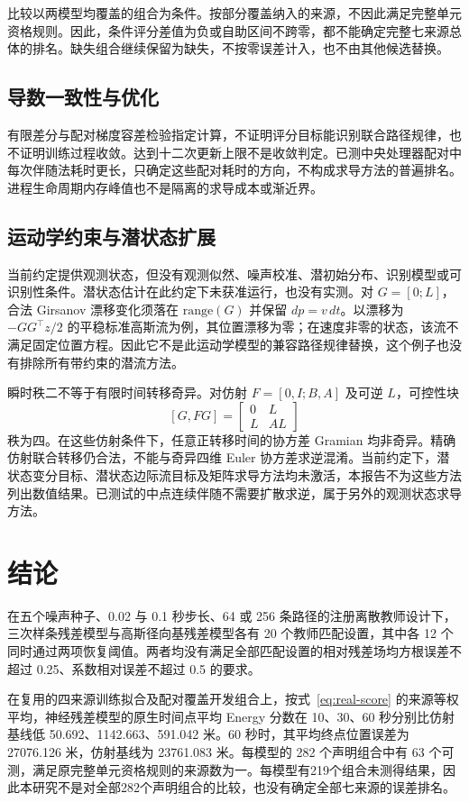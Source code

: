 \documentclass[UTF8,11pt]{ctexart}
\begin{document}
比较以两模型均覆盖的组合为条件。按部分覆盖纳入的来源，不因此满足完整单元资格规则。因此，条件评分差值为负或自助区间不跨零，都不能确定完整七来源总体的排名。缺失组合继续保留为缺失，不按零误差计入，也不由其他候选替换。

\subsection{导数一致性与优化}
有限差分与配对梯度容差检验指定计算，不证明评分目标能识别联合路径规律，也不证明训练过程收敛。达到十二次更新上限不是收敛判定。已测中央处理器配对中每次伴随法耗时更长，只确定这些配对耗时的方向，不构成求导方法的普遍排名。进程生命周期内存峰值也不是隔离的求导成本或渐近界。

\subsection{运动学约束与潜状态扩展}\label{sec:latent}
当前约定提供观测状态，但没有观测似然、噪声校准、潜初始分布、识别模型或可识别性条件。潜状态估计在此约定下未获准运行，也没有实测。对 $G=[0;L]$，合法 Girsanov 漂移变化须落在 $\mathrm{range}(G)$ 并保留 $dp=v\,dt$。以漂移为 $-GG^\top z/2$ 的平稳标准高斯流为例，其位置漂移为零；在速度非零的状态，该流不满足固定位置方程。因此它不是此运动学模型的兼容路径规律替换，这个例子也没有排除所有带约束的潜流方法\cite{bartosh2025}。

瞬时秩二不等于有限时间转移奇异。对仿射 $F=[0,I;B,A]$ 及可逆 $L$，可控性块
\[[G,FG]=\begin{bmatrix}0&L\\L&AL\end{bmatrix}\]
秩为四。在这些仿射条件下，任意正转移时间的协方差 Gramian 均非奇异。精确仿射联合转移仍合法，不能与奇异四维 Euler 协方差求逆混淆。当前约定下，潜状态变分目标、潜状态边际流目标及矩阵求导方法均未激活，本报告不为这些方法列出数值结果。已测试的中点连续伴随不需要扩散求逆，属于另外的观测状态求导方法。

\section{结论}\label{sec:conclusion}
在五个噪声种子、0.02 与 0.1 秒步长、64 或 256 条路径的注册离散教师设计下，三次样条残差模型与高斯径向基残差模型各有 20 个教师匹配设置，其中各 12 个同时通过两项恢复阈值。两者均没有满足全部匹配设置的相对残差场均方根误差不超过 0.25、系数相对误差不超过 0.5 的要求。

在复用的四来源训练拟合及配对覆盖开发组合上，按式~\eqref{eq:real-score} 的来源等权平均，神经残差模型的原生时间点平均 Energy 分数在 10、30、60 秒分别比仿射基线低 50.692、1142.663、591.042 米。60 秒时，其平均终点位置误差为 27076.126 米，仿射基线为 23761.083 米。每模型的 282 个声明组合中有 63 个可测，满足原完整单元资格规则的来源数为一。每模型有219个组合未测得结果，因此本研究不是对全部282个声明组合的比较，也没有确定全部七来源的误差排名。
\end{document}
